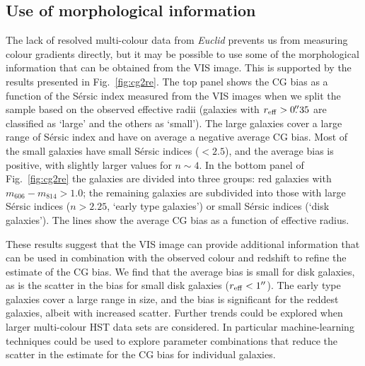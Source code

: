 \documentclass[useAMS,usenatbib]{mnras}
\begin{document}
\subsection{Use of morphological information}

The lack of resolved multi-colour data from {\it Euclid} prevents us from
measuring colour gradients directly, but it may be possible to use some of the morphological
information that can be obtained from the VIS image. This is supported by the results
presented in Fig.~\ref{fig:cg2re}. The top panel shows the CG bias as a function of the
S{\'e}rsic index measured from the VIS images when we split the sample based on the
observed effective radii (galaxies with $r_{\rm eff}>0\hbox{$.\!\!^{\prime\prime}$} 35$ are classified as `large'
and the others as `small'). The large galaxies cover a large range of S{\'e}rsic index and have on average a negative average CG bias. Most of the small galaxies have small S{\'e}rsic indices ($<2.5$), and
the average bias is positive, with slightly larger values for $n\sim 4$.
In the bottom panel of Fig.~\ref{fig:cg2re} the galaxies are divided into three groups: red galaxies
with $m_{606}-m_{814}>1.0$; the remaining galaxies are subdivided into those with
large S{\'e}rsic indices ($n>2.25$, `early type galaxies') or small S{\'e}rsic indices (`disk galaxies').
The lines show the average CG bias as a function of effective radius.

These results suggest that the VIS image can provide additional information that can be
used in combination with the observed colour and redshift to refine the estimate of the
CG bias.  We find that the average bias is small for disk galaxies, as is the scatter
in the bias for small disk galaxies ($r_{\rm eff}<1''$). The early type galaxies cover
a large range in size, and the bias is significant for the reddest galaxies, albeit with
increased scatter. Further trends could be explored when larger multi-colour HST data sets
are considered. In particular machine-learning techniques could be used to explore
parameter combinations that reduce the scatter in the estimate for the CG bias for individual galaxies.
\end{document}
